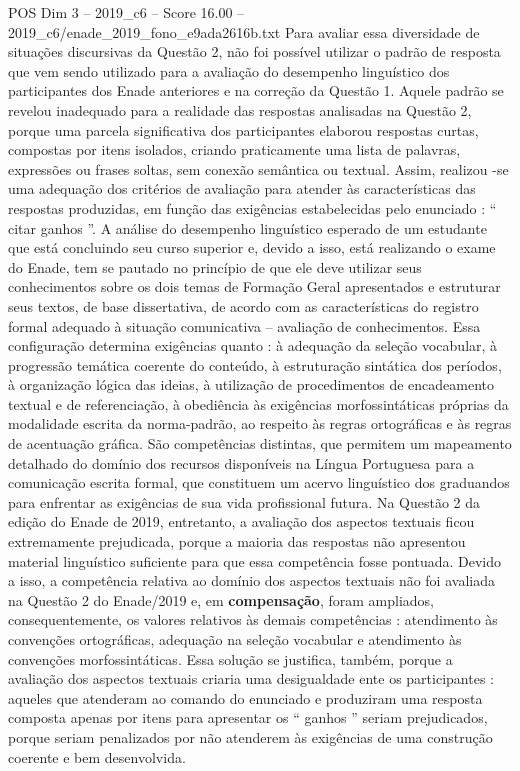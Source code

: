 \begin{textsample}{POS Dim 3 – 2019\_c6 – Score 16.00 – 2019\_c6/enade\_2019\_fono\_e9ada2616b.txt}
Para avaliar essa diversidade de situações discursivas da Questão 2, não foi possível utilizar o padrão de resposta que vem sendo utilizado para a avaliação do desempenho linguístico dos participantes dos Enade anteriores e na correção da Questão 1.
Aquele padrão se revelou inadequado para a realidade das respostas analisadas na Questão 2, porque uma parcela significativa dos participantes elaborou respostas curtas, compostas por itens isolados, criando praticamente uma lista de palavras, expressões ou frases soltas, sem conexão semântica ou textual.
Assim, realizou -se uma adequação dos critérios de avaliação para atender às características das respostas produzidas, em função das exigências estabelecidas pelo enunciado : “ citar ganhos ”.
A análise do desempenho linguístico esperado de um estudante que está concluindo seu curso superior e, devido a isso, está realizando o exame do Enade, tem se pautado no princípio de que ele deve utilizar seus conhecimentos sobre os dois temas de Formação Geral apresentados e estruturar seus textos, de base dissertativa, de acordo com as características do registro formal adequado à situação comunicativa – avaliação de conhecimentos.
Essa configuração determina exigências quanto : à adequação da seleção vocabular, à progressão temática coerente do conteúdo, à estruturação sintática dos períodos, à organização lógica das ideias, à utilização de procedimentos de encadeamento textual e de referenciação, à obediência às exigências morfossintáticas próprias da modalidade escrita da norma-padrão, ao respeito às regras ortográficas e às regras de acentuação gráfica.
São competências distintas, que permitem um mapeamento detalhado do domínio dos recursos disponíveis na Língua Portuguesa para a comunicação escrita formal, que constituem um acervo linguístico dos graduandos para enfrentar as exigências de sua vida profissional futura.
Na Questão 2 da edição do Enade de 2019, entretanto, a avaliação dos aspectos textuais ficou extremamente prejudicada, porque a maioria das respostas não apresentou material linguístico suficiente para que essa competência fosse pontuada.
Devido a isso, a competência relativa ao domínio dos aspectos textuais não foi avaliada na Questão 2 do Enade/2019 e, em \textbf{compensação}, foram ampliados, consequentemente, os valores relativos às demais competências : atendimento às convenções ortográficas, adequação na seleção vocabular e atendimento às convenções morfossintáticas.
Essa solução se justifica, também, porque a avaliação dos aspectos textuais criaria uma desigualdade ente os participantes : aqueles que atenderam ao comando do enunciado e produziram uma resposta composta apenas por itens para apresentar os “ ganhos ” seriam prejudicados, porque seriam penalizados por não atenderem às exigências de uma construção coerente e bem desenvolvida.

\end{textsample}
